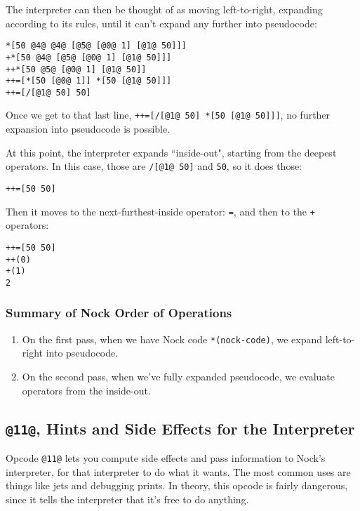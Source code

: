 \documentclass[twoside]{article}
\begin{document}
\noindent
The interpreter can then be thought of as moving left-to-right, expanding according to its rules, until it can't expand any further into pseudocode:

\begin{lstlisting}[style=listingblock]
*[50 @4@ @4@ [@5@ [@0@ 1] [@1@ 50]]]
+*[50 @4@ [@5@ [@0@ 1] [@1@ 50]]]
++*[50 @5@ [@0@ 1] [@1@ 50]]
++=[*[50 [@0@ 1]] *[50 [@1@ 50]]]
++=[/[@1@ 50] 50]
\end{lstlisting}

\noindent
Once we get to that last line, \lstinline[style=inlinecode]{++=[/[@1@ 50] *[50 [@1@ 50]]]}, no further expansion into pseudocode is possible.

At this point, the interpreter expands ``inside-out", starting from the deepest operators. In this case, those are \lstinline[style=inlinecode]{/[@1@ 50]} and \lstinline[style=inlinecode]{50}, so it does those:

\begin{lstlisting}[style=listingblock]
++=[50 50]
\end{lstlisting}

\noindent
Then it moves to the next-furthest-inside operator: \lstinline[style=inlinecode]{=}, and then to the \lstinline[style=inlinecode]{+} operators:

\begin{lstlisting}[style=listingblock]
++=[50 50]
++(0)
+(1)
2
\end{lstlisting}

\subsubsection{Summary of Nock Order of Operations}

\begin{enumerate}
  \item  On the first pass, when we have Nock code \lstinline[style=inlinecode]{*(nock-code)}, we expand left-to-right into pseudocode.
  \item  On the second pass, when we've fully expanded pseudocode, we evaluate operators from the inside-out.
\end{enumerate}

\subsection{\lstinline[style=inlinecode]{@11@}, Hints and Side Effects for the Interpreter}

Opcode \lstinline[style=inlinecode]{@11@} lets you compute side effects and pass information to Nock's interpreter, for that interpreter to do what it wants. The most common uses are things like jets and debugging prints. In theory, this opcode is fairly dangerous, since it tells the interpreter that it's free to do anything.
\end{document}

